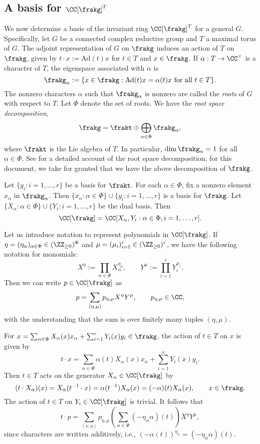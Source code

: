 \subsection{A basis for $\CC[\frakg]^T$}
We now determine a basis of the invariant ring $\CC[\frakg]^T$ for a general $G$.
Specifically, let $G$ be a connected complex reductive group and $T$ a maximal torus of $G$.
The adjoint representation of $G$ on $\frakg$ induces an action of $T$ on $\frakg$, given by $t \cdot x := \mathrm{Ad}(t)x$ for $t \in T$ and $x \in \frakg$.
If $\alpha : T \to \CC^\times$ is a character of $T$, the eigenspace associated with $\alpha$ is
$$\frakg_\alpha := \{x \in \frakg : \mathrm{Ad}(t) x = \alpha(t) x \text{ for all } t \in T\}.$$
The nonzero characters $\alpha$ such that $\frakg_\alpha$ is nonzero are called the \emph{roots} of $G$ with respect to $T$.
Let $\Phi$ denote the set of roots.
We have the \emph{root space decomposition},
$$\frakg = \frakt \oplus \bigoplus_{\alpha \in \Phi} \frakg_\alpha,$$
where $\frakt$ is the Lie algebra of $T$.
In particular, $\dim \frakg_\alpha = 1$ for all $\alpha \in \Phi$.
See \cite[II, \S 5]{Milne13} for a detailed account of the root space decomposition;
for this document, we take for granted that we have the above decomposition of $\frakg$.

Let $\{y_i : i=1, \ldots, r\}$ be a basis for $\frakt$.
For each $\alpha \in \Phi$, fix a nonzero element $x_\alpha$ in $\frakg_\alpha$.
Then $\{x_\alpha : \alpha\in\Phi\}\cup\{y_i:i=1,\ldots,r\}$ is a basis for $\frakg$.
Let $\{X_\alpha : \alpha \in \Phi\}\cup\{Y_i:i=1,\ldots,r\}$ be the dual basis.
Then
$$\CC[\frakg]=\CC[X_\alpha, Y_i : \alpha \in \Phi, i=1,\ldots,r].$$

Let us introduce notation to represent polynomials in $\CC[\frakg]$.
If $\eta =(\eta_\alpha)_{\alpha\in\Phi}\in(\ZZ_{\ge 0})^\Phi$ and $\mu =(\mu_i)_{i=1}^r \in (\ZZ_{\ge 0})^r$, we have the following notation for monomials:
$$X^\eta := \prod_{\alpha\in\Phi} X_\alpha^{\eta_\alpha}, \qquad Y^\mu := \prod_{i=1}^r Y_i^{\mu_i}.$$
Then we can write $p \in \CC[\frakg]$ as
$$p = \sum_{(\eta, \mu)} p_{\eta, \mu} X^\eta Y^\mu, \qquad p_{\eta,\mu} \in \CC,$$
with the understanding that the sum is over finitely many tuples $(\eta, \mu)$.

For $x=\sum_{\alpha \in \Phi} X_\alpha(x) x_\alpha + \sum_{i=1}^r Y_i(x) y_i \in \frakg$, the action of $t \in T$ on $x$ is given by
$$t \cdot x = \sum_{\alpha \in \Phi} \alpha(t) X_\alpha(x) x_\alpha + \sum_{i=1}^r Y_i(x) y_i.$$
Then $t \in T$ acts on the generator $X_\alpha \in \CC[\frakg]$ by
$$(t\cdot X_\alpha)(x) = X_\alpha(t^{-1} \cdot x) =\alpha(t^{-1})X_\alpha(x) = (-\alpha)(t)X_\alpha(x), \qquad x \in \frakg.$$
The action of $t \in T$ on $Y_i \in \CC[\frakg]$ is trivial.
It follows that
$$t \cdot p = \sum_{(\nu, \eta)} p_{\eta, \mu} \left(\sum_{\alpha\in\Phi} (-\eta_\alpha \alpha)(t) \right) X^\eta Y^\mu,$$
since characters are written additively, i.e., $(-\alpha(t))^{\eta_\alpha} = (-\eta_\alpha \alpha)(t)$.

